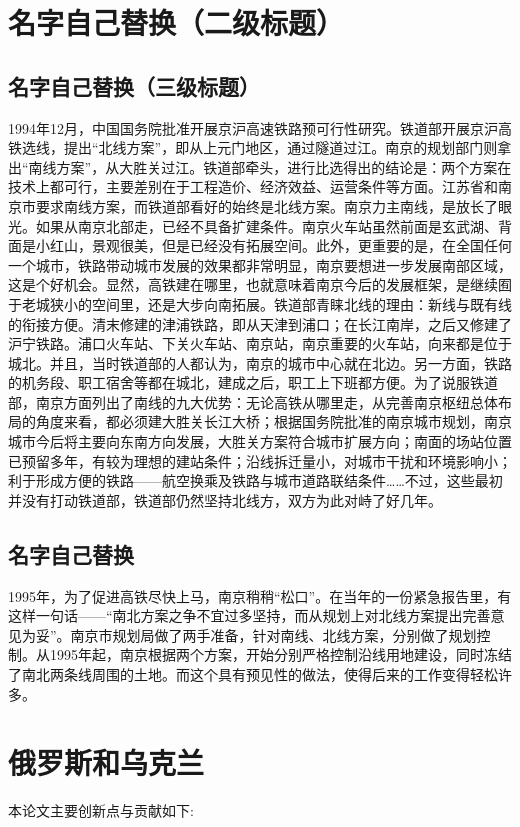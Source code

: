 \documentclass[bachelor]{njupthesis}
\begin{document}
\section{名字自己替换（二级标题）}
\subsection{名字自己替换（三级标题）}
1994年12月，中国国务院批准开展京沪高速铁路预可行性研究。铁道部开展京沪高铁选线，提出“北线方案”，即从上元门地区，通过隧道过江。南京的规划部门则拿出“南线方案”，从大胜关过江。铁道部牵头，进行比选得出的结论是：两个方案在技术上都可行，主要差别在于工程造价、经济效益、运营条件等方面。江苏省和南京市要求南线方案，而铁道部看好的始终是北线方案。南京力主南线，是放长了眼光。如果从南京北部走，已经不具备扩建条件。南京火车站虽然前面是玄武湖、背面是小红山，景观很美，但是已经没有拓展空间。此外，更重要的是，在全国任何一个城市，铁路带动城市发展的效果都非常明显，南京要想进一步发展南部区域，这是个好机会。显然，高铁建在哪里，也就意味着南京今后的发展框架，是继续囿于老城狭小的空间里，还是大步向南拓展。铁道部青睐北线的理由：新线与既有线的衔接方便。清末修建的津浦铁路，即从天津到浦口；在长江南岸，之后又修建了沪宁铁路。浦口火车站、下关火车站、南京站，南京重要的火车站，向来都是位于城北。并且，当时铁道部的人都认为，南京的城市中心就在北边。另一方面，铁路的机务段、职工宿舍等都在城北，建成之后，职工上下班都方便。为了说服铁道部，南京方面列出了南线的九大优势：无论高铁从哪里走，从完善南京枢纽总体布局的角度来看，都必须建大胜关长江大桥；根据国务院批准的南京城市规划，南京城市今后将主要向东南方向发展，大胜关方案符合城市扩展方向；南面的场站位置已预留多年，有较为理想的建站条件；沿线拆迁量小，对城市干扰和环境影响小；利于形成方便的铁路——航空换乘及铁路与城市道路联结条件……不过，这些最初并没有打动铁道部，铁道部仍然坚持北线方，双方为此对峙了好几年。


\subsection{名字自己替换}
1995年，为了促进高铁尽快上马，南京稍稍“松口”。在当年的一份紧急报告里，有这样一句话——“南北方案之争不宜过多坚持，而从规划上对北线方案提出完善意见为妥”。南京市规划局做了两手准备，针对南线、北线方案，分别做了规划控制。从1995年起，南京根据两个方案，开始分别严格控制沿线用地建设，同时冻结了南北两条线周围的土地。而这个具有预见性的做法，使得后来的工作变得轻松许多。

\section{俄罗斯和乌克兰}
本论文主要创新点与贡献如下\cite{荣洁2005俄罗斯民族性格和文化}:
\end{document}
